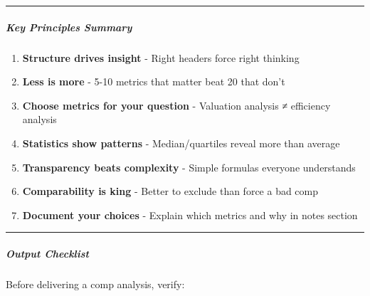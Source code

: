\documentclass[11pt]{article}
\begin{document}
\vspace{0.5em}\hrule\vspace{0.5em}

\subparagraph{Key Principles Summary}\mbox{}\par

\begin{enumerate}[leftmargin=*,itemsep=2pt,topsep=2pt]
\item {} \textbf{Structure drives insight} - Right headers force right thinking
\item {} \textbf{Less is more} - 5-10 metrics that matter beat 20 that don't
\item {} \textbf{Choose metrics for your question} - Valuation analysis ≠ efficiency analysis
\item {} \textbf{Statistics show patterns} - Median/quartiles reveal more than average
\item {} \textbf{Transparency beats complexity} - Simple formulas everyone understands
\item {} \textbf{Comparability is king} - Better to exclude than force a bad comp
\item {} \textbf{Document your choices} - Explain which metrics and why in notes section
\end{enumerate}

\vspace{0.5em}\hrule\vspace{0.5em}

\subparagraph{Output Checklist}\mbox{}\par

Before delivering a comp analysis, verify:
\end{document}
